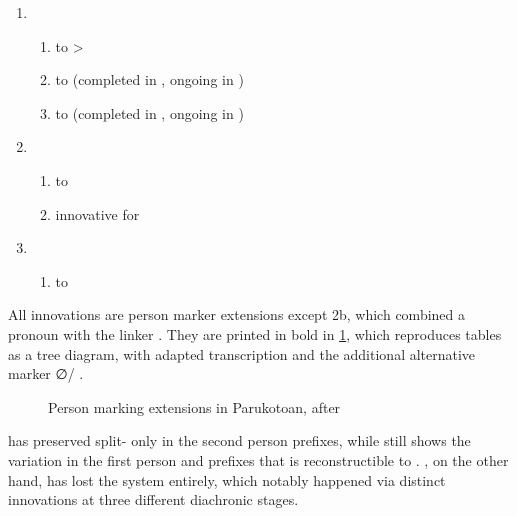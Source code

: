 \begin{enumerate}
	\item \PPar \begin{enumerate}
		\item {}  to >
		\item {}  to  (completed in \PWai, ongoing in \kaxui)
		\item {}  to  (completed in \PWai, ongoing in \kaxui)
	\end{enumerate}
	\item \PWai \begin{enumerate}
		\item {}  to 
		\item innovative   for 
	\end{enumerate}
	\item \waiwai \begin{enumerate}
		\item {}  to \end{enumerate}
\end{enumerate}
%
All innovations are person marker extensions except 2b, which combined a pronoun with the linker .
They are printed in bold in \cref{fig:par_ext}, which reproduces  tables as a tree diagram, with adapted transcription and the additional alternative \kaxui {} marker ∅/ .
%
\begin{figure}[hbt]
	\centering
	\setlength{\tabcolsep}{2pt}
	\caption{Person marking extensions in Parukotoan, after \textcite[94]{gildea1998}}
	\label{fig:par_ext}
\end{figure}
%
\hixka has preserved split- only in the second person prefixes, while \kaxui still shows the variation in the first person and  prefixes that is reconstructible to \PPar.
\waiwai, on the other hand, has lost the system entirely, which notably happened via distinct innovations at three different diachronic stages.


